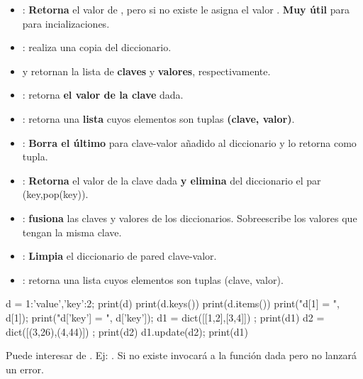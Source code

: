 \begin{itemize}

\item {}: \textbf{Retorna} el valor de , pero si  no existe le asigna el valor . \textbf{Muy útil} para para incializaciones.

\item {}: realiza una copia del diccionario. 

\item {} y  retornan la lista de \textbf{claves} y \textbf{valores}, respectivamente.

\item {}: retorna \textbf{el valor de la clave} dada.

\item {}: retorna una \textbf{lista} cuyos elementos son tuplas \textbf{(clave, valor)}.

\item {}: \textbf{Borra el último} para clave-valor añadido al diccionario y lo retorna como tupla.

\item {}: \textbf{Retorna} el valor de la clave dada \textbf{y elimina} del diccionario el par (key,pop(key)).

\item {}: \textbf{fusiona} las claves y valores de los diccionarios. Sobreescribe los valores que tengan la misma clave. 

\item {}: \textbf{Limpia} el diccionario de pared clave-valor. 

\item {}: retorna una lista cuyos elementos son tuplas (clave, valor).

\end{itemize}

\hfil
\begin{minipage}{.6\textwidth}
\begin{pyconsole}[][frame=single]
d = {1:'value','key':2}; 
print(d)
print(d.keys())
print(d.items())
print("d[1] = ", d[1]);
print("d['key'] = ", d['key']);
d1 = dict([[1,2],[3,4]])   ; print(d1)
d2 = dict([(3,26),(4,44)]) ; print(d2)
d1.update(d2); print(d1)
\end{pyconsole}
\end{minipage}

Puede interesar  de .  Ej: . Si  no existe invocará a la función dada  pero no lanzará un error.




